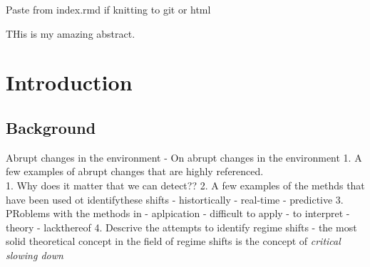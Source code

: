 \documentclass[12pt,twoside]{reedthesis}
\begin{document}
Paste from index.rmd if knitting to git or html

THis is my amazing abstract.

\chapter{Introduction}\label{intro-chapter}

\section{Background}\label{background}

Abrupt changes in the environment - On abrupt changes in the environment
1. A few examples of abrupt changes that are highly referenced.\\
1. Why does it matter that we can detect?? 2. A few examples of the
methds that have been used ot identifythese shifts - histortically -
real-time - predictive 3. PRoblems with the methods in - aplpication -
difficult to apply - to interpret - theory - lackthereof 4. Descrive the
attempts to identify regime shifts - the most solid theoretical concept
in the field of regime shifts is the concept of \emph{critical slowing
down}
\end{document}
